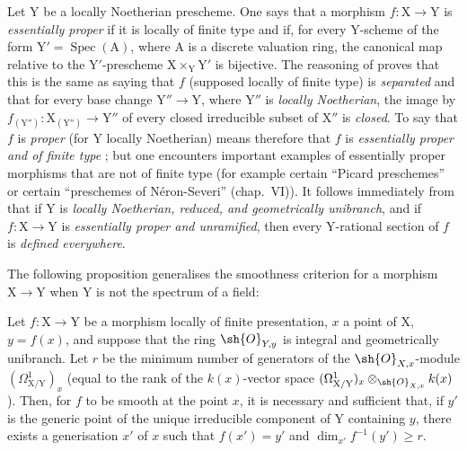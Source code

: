\begin{remark}[18.10.20]
\label{IV.18.10.20}
Let $\mathrm{Y}$ be a locally Noetherian prescheme.
One says that a morphism $f:\mathrm{X}\to\mathrm{Y}$ is \emph{essentially proper} if it is locally of finite type and if, for every $\mathrm{Y}$-scheme of the form $\mathrm{Y}'=\operatorname{Spec}(\mathrm{A})$, where $\mathrm{A}$ is a discrete valuation ring, the canonical map  relative to the $\mathrm{Y}'$-prescheme $\mathrm{X}\times_{\mathrm{Y}}\mathrm{Y}'$ is bijective.
The reasoning of  proves that this is the same as saying that $f$ (supposed locally of finite type) is \emph{separated} and that for every base change $\mathrm{Y}''\to\mathrm{Y}$, where $\mathrm{Y}''$ is \emph{locally Noetherian}, the image by $f_{(\mathrm{Y}'')}: \mathrm{X}_{(\mathrm{Y}'')}\to\mathrm{Y}''$ of every closed irreducible subset of $\mathrm{X}''$ is \emph{closed}.
To say that $f$ is \emph{proper} (for $\mathrm{Y}$ locally Noetherian) means therefore that $f$ is \emph{essentially proper and of finite type} ; but one encounters important examples of essentially proper morphisms that are not of finite type (for example certain ``Picard preschemes'' or certain ``preschemes of N\'eron-Severi'' (chap.~VI)).
It follows immediately from  that if $\mathrm{Y}$ is \emph{locally Noetherian, reduced, and geometrically unibranch}, and if $f:\mathrm{X}\to\mathrm{Y}$ is \emph{essentially proper and unramified}, then every $\mathrm{Y}$-rational section of $f$ is \emph{defined everywhere}.
\end{remark}

The following proposition generalises the smoothness criterion  for a morphism $\mathrm{X}\to\mathrm{Y}$ when $\mathrm{Y}$ is not the spectrum of a field:

\begin{proposition}[18.10.21]
\label{IV.18.10.21}
Let $f:\mathrm{X}\to\mathrm{Y}$ be a morphism locally of finite presentation, $x$ a point of $\mathrm{X}$, $y=f(x)$, and suppose that the ring $\sh{O}_{Y,y}$ is integral and geometrically unibranch.
Let $r$ be the minimum number of generators of the $\sh{O}_{X,x}$-module $(\Omega^1_{\mathrm{X}/\mathrm{Y}})_x$ (equal to the rank of the $k(x)$-vector space $(\Omega^1_{\mathrm{X}/\mathrm{Y}})_x\otimes_{\sh{O}_{X,x}}k(x)$).
Then, for $f$ to be smooth at the point $x$, it is necessary and sufficient that, if $y'$ is the generic point of the unique irreducible component of $\mathrm{Y}$ containing $y$, there exists a generisation $x'$ of $x$ such that $f(x')=y'$ and $\dim_{x'}f^{-1}(y')\geq r$.
\end{proposition}

